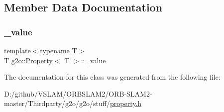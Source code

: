 \subsection{Member Data Documentation}
\mbox{\label{classg2o_1_1_property_ae51b1fe0e0a1f0d9a2bcbef7ea3afcf7}} 
\subsubsection{\texorpdfstring{\+\_\+value}{\_value}}
{\footnotesize\ttfamily template$<$typename T$>$ \\
T \mbox{\hyperlink{classg2o_1_1_property}{g2o\+::\+Property}}$<$ T $>$\+::\+\_\+value\hspace{0.3cm}{\ttfamily [protected]}}



The documentation for this class was generated from the following file\+:\begin{DoxyCompactItemize}
\item 
D\+:/github/\+V\+S\+L\+A\+M/\+O\+R\+B\+S\+L\+A\+M2/\+O\+R\+B-\/\+S\+L\+A\+M2-\/master/\+Thirdparty/g2o/g2o/stuff/\mbox{\hyperlink{property_8h}{property.\+h}}\end{DoxyCompactItemize}
